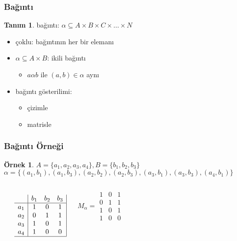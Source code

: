 \documentclass[dvipsnames]{beamer}
\theoremstyle{definition}
\newtheorem{tanim}[theorem]{Tanım}
\theoremstyle{example}
\newtheorem{ornek}[theorem]{Örnek}
\theoremstyle{plain}
\begin{document}
\begin{frame}
  \frametitle{Bağıntı}

  \begin{tanim}
    \alert{bağıntı}: $\alpha \subseteq A \times B \times C \times \dots \times N$
  \end{tanim}

  \pause
  \begin{itemize}
    \item \alert{çoklu}: bağıntının her bir elemanı

    \pause
    \medskip
    \item $\alpha \subseteq A \times B$: \alert{ikili bağıntı}
    \begin{itemize}
      \item $a \alpha b$ ile $(a,b) \in \alpha$ aynı
    \end{itemize}

    \pause
    \medskip
    \item bağıntı gösterilimi:
    \begin{itemize}
      \item çizimle
      \item matrisle
    \end{itemize}
  \end{itemize}
\end{frame}

\begin{frame}
  \frametitle{Bağıntı Örneği}

  \begin{ornek}
    $A=\{a_1,a_2,a_3,a_4\}, B=\{b_1,b_2,b_3\}$\\
    $\alpha = \{(a_1,b_1),(a_1,b_3),(a_2,b_2),(a_2,b_3),
                (a_3,b_1),(a_3,b_3),(a_4,b_1)\}$

    \pause
    \medskip
    \begin{columns}
      \begin{center}
      \end{center}

      \[
        \begin{array}{c|ccc|}
              & b_1 & b_2 & b_3\\\hline
          a_1 &  1  &  0  &  1\\
          a_2 &  0  &  1  &  1\\
          a_3 &  1  &  0  &  1\\
          a_4 &  1  &  0  &  0\\\hline
        \end{array}
      \]

      \[
        M_\alpha =
          \begin{array}{|ccc|}
            1 & 0 & 1\\
            0 & 1 & 1\\
            1 & 0 & 1\\
            1 & 0 & 0
          \end{array}
      \]
    \end{columns}
  \end{ornek}
\end{frame}
\end{document}
